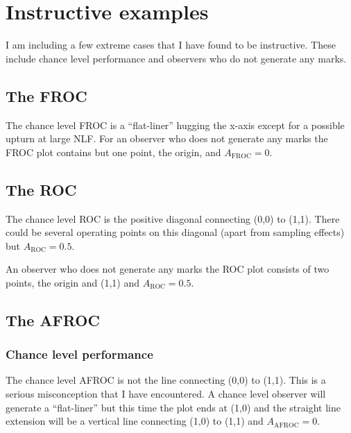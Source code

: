 \documentclass[
]{book}
\begin{document}
\hypertarget{empirical-instructive-cases}{%
\section{Instructive examples}\label{empirical-instructive-cases}}

I am including a few extreme cases that I have found to be instructive. These include chance level performance and observers who do not generate any marks.

\hypertarget{empirical-instructive-cases-FROC}{%
\subsection{The FROC}\label{empirical-instructive-cases-FROC}}

The chance level FROC is a ``flat-liner'' hugging the x-axis except for a possible upturn at large NLF. For an observer who does not generate any marks the FROC plot contains but one point, the origin, and \(A_{\text{FROC}}=0\).

\hypertarget{empirical-instructive-cases-ROC}{%
\subsection{The ROC}\label{empirical-instructive-cases-ROC}}

The chance level ROC is the positive diagonal connecting (0,0) to (1,1). There could be several operating points on this diagonal (apart from sampling effects) but \(A_{\text{ROC}}=0.5\).

An observer who does not generate any marks the ROC plot consists of two points, the origin and (1,1) and \(A_{\text{ROC}}=0.5\).

\hypertarget{empirical-instructive-cases-AFROC}{%
\subsection{The AFROC}\label{empirical-instructive-cases-AFROC}}

\hypertarget{empirical-instructive-cases-AFROC-chance-level}{%
\subsubsection{Chance level performance}\label{empirical-instructive-cases-AFROC-chance-level}}

The chance level AFROC is not the line connecting (0,0) to (1,1). This is a serious misconception that I have encountered. A chance level observer will generate a ``flat-liner'' but this time the plot ends at (1,0) and the straight line extension will be a vertical line connecting (1,0) to (1,1) and \(A_{\text{AFROC}}=0\).
\end{document}
